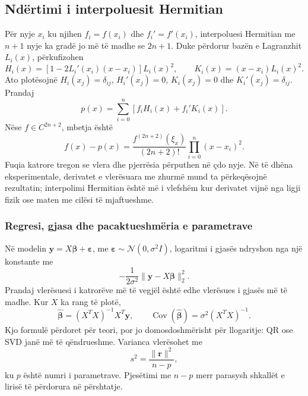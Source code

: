 \documentclass[11pt,oneside,openany]{book}
\newcommand{\vect}[1]{\bm{#1}}
\newcommand{\Cov}{\operatorname{Cov}}
\begin{document}


\subsection{Ndërtimi i interpoluesit Hermitian}
Për nyje $x_i$ ku njihen $f_i=f(x_i)$ dhe $f_i'=f'(x_i)$, interpoluesi Hermitian me $n+1$ nyje ka gradë jo më të madhe se $2n+1$. Duke përdorur bazën e Lagranzhit $L_i(x)$, përkufizohen
\begin{equation}
 H_i(x)=\left[1-2L_i'(x_i)(x-x_i)\right]L_i(x)^2,
 \qquad
 K_i(x)=(x-x_i)L_i(x)^2.
\end{equation}
Ato plotësojnë $H_i(x_j)=\delta_{ij}$, $H_i'(x_j)=0$, $K_i(x_j)=0$ dhe $K_i'(x_j)=\delta_{ij}$. Prandaj
\begin{equation}
 p(x)=\sum_{i=0}^{n}\left[f_iH_i(x)+f_i'K_i(x)\right].
\end{equation}
Nëse $f\in C^{2n+2}$, mbetja është
\begin{equation}
 f(x)-p(x)=\frac{f^{(2n+2)}(\xi_x)}{(2n+2)!}
 \prod_{i=0}^{n}(x-x_i)^2.
\end{equation}
Fuqia katrore tregon se vlera dhe pjerrësia përputhen në çdo nyje. Në të dhëna eksperimentale, derivatet e vlerësuara me zhurmë mund ta përkeqësojnë rezultatin; interpolimi Hermitian është më i vlefshëm kur derivatet vijnë nga ligji fizik ose maten me cilësi të mjaftueshme.

\subsubsection{Regresi, gjasa dhe pacaktueshmëria e parametrave}
Në modelin $\vect y=X\vect\beta+\vect\varepsilon$, me $\vect\varepsilon\sim\mathcal N(0,\sigma^2I)$, logaritmi i gjasës ndryshon nga një konstante me
\begin{equation}
 -\frac{1}{2\sigma^2}\|\vect y-X\vect\beta\|_2^2.
\end{equation}
Prandaj vlerësuesi i katrorëve më të vegjël është edhe vlerësues i gjasës më të madhe. Kur $X$ ka rang të plotë,
\begin{equation}
 \widehat{\vect\beta}=(X^TX)^{-1}X^T\vect y,
 \qquad
 \Cov(\widehat{\vect\beta})=\sigma^2(X^TX)^{-1}.
\end{equation}
Kjo formulë përdoret për teori, por jo domosdoshmërisht për llogaritje: QR ose SVD janë më të qëndrueshme. Varianca vlerësohet me
\begin{equation}
 s^2=\frac{\|\vect r\|^2}{n-p},
\end{equation}
ku $p$ është numri i parametrave. Pjesëtimi me $n-p$ merr parasysh shkallët e lirisë të përdorura në përshtatje.
\end{document}
